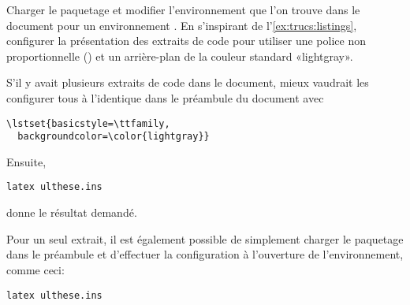 \begin{exercice}
  \label{exercice:trucs:n}
  Charger le paquetage  et modifier l'environnement
   que l'on trouve dans le document pour un environnement
  . En s'inspirant de l'\autoref{ex:trucs:listings},
  configurer la présentation des extraits de code pour utiliser une
  police non proportionnelle (\cmdprint{\ttfamily}) et un arrière-plan
  de la couleur standard «lightgray».
  \begin{sol}
    S'il y avait plusieurs extraits de code dans le document, mieux
    vaudrait les configurer tous à l'identique dans le préambule du
    document avec
\begin{lstlisting}
\lstset{basicstyle=\ttfamily,
  backgroundcolor=\color{lightgray}}
\end{lstlisting}
    Ensuite,
\begin{vglisting}
\begin{lstlisting}
latex ulthese.ins
\end{lstlisting}
\end{vglisting}
    donne le résultat demandé.

    Pour un seul extrait, il est également possible de simplement
    charger le paquetage dans le préambule et d'effectuer la
    configuration à l'ouverture de l'environnement, comme ceci:
\begin{vglisting}
\begin{lstlisting}[basicstyle=\ttfamily,
  backgroundcolor=\color{lightgray}]
latex ulthese.ins
\end{lstlisting}
\end{vglisting}
  \end{sol}
\end{exercice}

